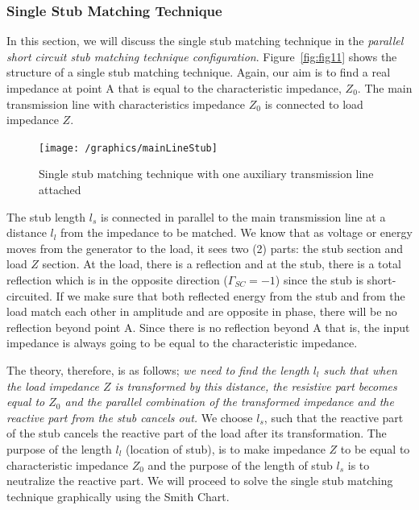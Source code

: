 \subsubsection{Single Stub Matching Technique}
In this section, we will discuss the single stub matching technique in the \textit{parallel short circuit stub matching technique configuration}. Figure~\ref{fig:fig11} shows the structure of a single stub matching technique. Again, our aim is to find a real impedance at point A that is equal to the characteristic impedance, $Z_0$. The main transmission line with characteristics impedance $ Z_0$ is connected to load impedance $Z$.
\begin{figure}[h]
\centering
\texttt{[image: /graphics/mainLineStub]}
\caption{Single stub matching technique with one auxiliary transmission line attached}
\label{fig:mainLineStub}
\end{figure}

The stub length $l_s$ is connected in parallel to the main transmission line at a distance $ l_l$ from the impedance to be matched. We know that as voltage or energy moves from the generator to the load, it sees two (2) parts: the stub section and load $Z$ section. At the load, there is a reflection and at the stub, there is a total reflection which is in the opposite direction ($\Gamma_{SC} = -1$) since the stub is short-circuited. If we make sure that both reflected energy from the stub and from the load match each other in amplitude and are opposite in phase, there will be no reflection beyond point A. Since there is no reflection beyond A that is, the input impedance is always going to be equal to the characteristic impedance.

The theory, therefore, is as follows; \emph{we need to find the length $ l_l$ such that when the load impedance $Z$ is transformed by this distance, the resistive part becomes equal to $Z_0$ and the parallel combination of the transformed impedance and the reactive part from the stub cancels out.} We choose $l_s$, such that the reactive part of the stub cancels the reactive part of the load after its transformation. The purpose of the length $l_l$ (location of stub), is to make impedance $Z$ to be equal to characteristic impedance $Z_0$ and the purpose of the length of stub $l_s$ is to neutralize the reactive part. We will proceed to solve the single stub matching technique graphically using the Smith Chart.

